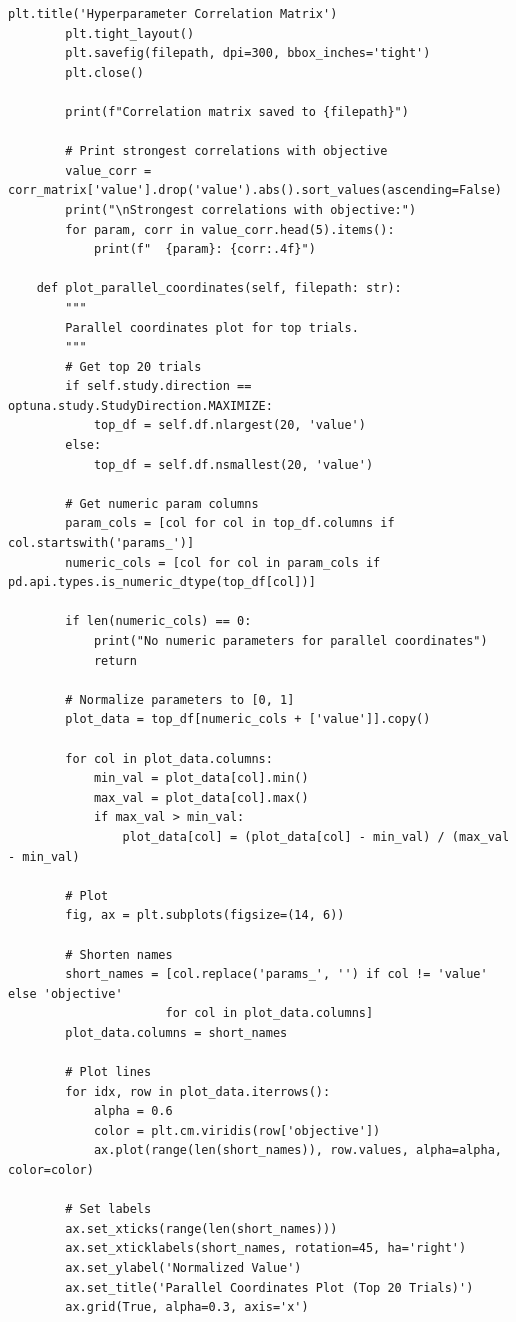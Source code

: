\begin{lstlisting}[style=python, caption=Comprehensive HPO analysis and visualization]
        plt.title('Hyperparameter Correlation Matrix')
        plt.tight_layout()
        plt.savefig(filepath, dpi=300, bbox_inches='tight')
        plt.close()

        print(f"Correlation matrix saved to {filepath}")

        # Print strongest correlations with objective
        value_corr = corr_matrix['value'].drop('value').abs().sort_values(ascending=False)
        print("\nStrongest correlations with objective:")
        for param, corr in value_corr.head(5).items():
            print(f"  {param}: {corr:.4f}")

    def plot_parallel_coordinates(self, filepath: str):
        """
        Parallel coordinates plot for top trials.
        """
        # Get top 20 trials
        if self.study.direction == optuna.study.StudyDirection.MAXIMIZE:
            top_df = self.df.nlargest(20, 'value')
        else:
            top_df = self.df.nsmallest(20, 'value')

        # Get numeric param columns
        param_cols = [col for col in top_df.columns if col.startswith('params_')]
        numeric_cols = [col for col in param_cols if pd.api.types.is_numeric_dtype(top_df[col])]

        if len(numeric_cols) == 0:
            print("No numeric parameters for parallel coordinates")
            return

        # Normalize parameters to [0, 1]
        plot_data = top_df[numeric_cols + ['value']].copy()

        for col in plot_data.columns:
            min_val = plot_data[col].min()
            max_val = plot_data[col].max()
            if max_val > min_val:
                plot_data[col] = (plot_data[col] - min_val) / (max_val - min_val)

        # Plot
        fig, ax = plt.subplots(figsize=(14, 6))

        # Shorten names
        short_names = [col.replace('params_', '') if col != 'value' else 'objective'
                      for col in plot_data.columns]
        plot_data.columns = short_names

        # Plot lines
        for idx, row in plot_data.iterrows():
            alpha = 0.6
            color = plt.cm.viridis(row['objective'])
            ax.plot(range(len(short_names)), row.values, alpha=alpha, color=color)

        # Set labels
        ax.set_xticks(range(len(short_names)))
        ax.set_xticklabels(short_names, rotation=45, ha='right')
        ax.set_ylabel('Normalized Value')
        ax.set_title('Parallel Coordinates Plot (Top 20 Trials)')
        ax.grid(True, alpha=0.3, axis='x')


\end{lstlisting}
